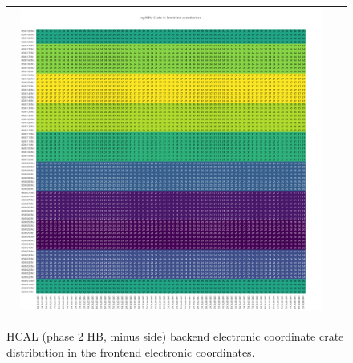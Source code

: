 \clearpage
\begin{figure}[htb]
 \begin{center}
  \begin{tabular}{cc}
   \includegraphics[angle=0,width=0.95\textwidth]{figures/appendix/ngHBM_Crate_in_FrontEnd.png}
  \end{tabular}
  \caption{HCAL (phase 2 HB, minus side) backend electronic coordinate crate distribution in the frontend electronic coordinates.}
  \label{fig:lmapngHBMCrateFEC}
 \end{center}
\end{figure}

